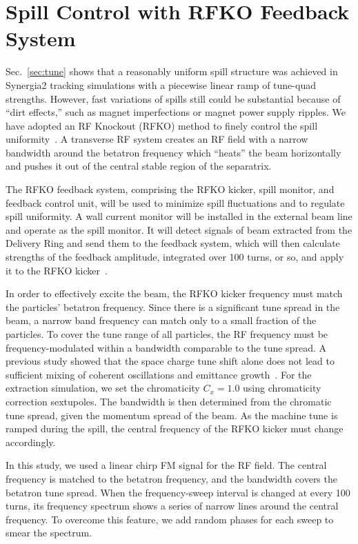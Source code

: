 \documentclass[aps,prstab,showpacs,onecolumn,12pt]{revtex4-1}
\begin{document}
\section{\label{sec:rfko}Spill Control with RFKO Feedback System}

Sec.~\ref{sec:tune} shows that a reasonably uniform spill structure was achieved in Synergia2 tracking simulations with a piecewise linear ramp of tune-quad strengths. However, fast variations of spills still could be substantial because of ``dirt effects,'' such as magnet imperfections or magnet power supply ripples. We have adopted an RF Knockout (RFKO) method to finely control the spill uniformity~\cite{HB10}. A transverse RF system creates an RF field with a narrow bandwidth around the betatron frequency which ``heats'' the beam horizontally and pushes it out of the central stable region of the separatrix.

The RFKO feedback system, comprising the RFKO kicker, spill monitor, and feedback control unit, will be used to minimize spill fluctuations and to regulate spill uniformity. A wall current monitor will be installed in the external beam line and operate as the spill monitor. It will detect signals of beam extracted from the Delivery Ring and send them to the feedback system, which will then calculate strengths of the feedback amplitude, integrated over 100 turns, or so, and apply it to the RFKO kicker~\cite{wcm}.

In order to effectively excite the beam, the RFKO kicker frequency must match the particles' betatron frequency. Since there is a significant tune spread in the beam, a narrow band frequency can match only to a small fraction of the particles. To cover the tune range of all particles, the RF frequency must be frequency-modulated within a bandwidth comparable to the tune spread. A previous study showed that the space charge tune shift alone does not lead to sufficient mixing of coherent oscillations and emittance growth~\cite{HB10}.  For the extraction simulation, we set the chromaticity \mbox{$C_{x} = 1.0$} using chromaticity correction sextupoles. The bandwidth is then determined from the chromatic tune spread, given the momentum spread of the beam. As the machine tune is ramped during the spill, the central frequency of the RFKO kicker must change accordingly.

In this study, we used a linear chirp FM signal for the RF field. The central frequency is matched to the betatron frequency, and the bandwidth covers the betatron tune spread. When the frequency-sweep interval is changed at every 100 turns, its frequency spectrum shows a series of narrow lines around the central frequency. To overcome this feature, we add random phases for each sweep to smear the spectrum. 
\end{document}
